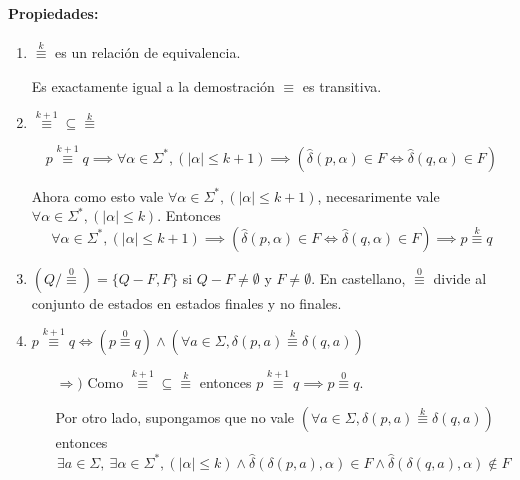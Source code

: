 \paragraph{Propiedades:}
\begin{enumerate}
  \item \(\overset{k}{\equiv}\) es un relación de equivalencia.
        \begin{demo}[\textwidth]
          Es exactamente igual a la demostración \(\equiv\) es transitiva.
        \end{demo}
  \item \(\overset{k+1}{\equiv}\subseteq\overset{k}{\equiv}\)
        \begin{demo}[\textwidth]
          \[ p \overset{k+1}{\equiv} q \implies \forall \alpha\in\Sigma^*, (|\alpha|\leq k+1) \implies (\hat\delta(p,\alpha) \in F \iff \hat\delta(q,\alpha) \in F)\]

          Ahora como esto vale \(\forall \alpha\in\Sigma^*, (|\alpha|\leq k+1)\), necesarimente vale \(\forall \alpha\in\Sigma^*, (|\alpha|\leq k)\). Entonces
          \[ \forall \alpha\in\Sigma^*, (|\alpha|\leq k+1) \implies (\hat\delta(p,\alpha) \in F \iff \hat\delta(q,\alpha) \in F) \implies p \overset{k}{\equiv} q\]
        \end{demo}
  \item \(\left(Q / \overset{0}{\equiv}\right) = \{Q-F, F\}\) si \(Q - F \neq \emptyset\) y \(F \neq\emptyset\). En castellano, \(\overset{0}{\equiv}\) divide al conjunto de estados en estados finales y no finales.
  \item \(
        p\overset{k+1}{\equiv} q \iff \left(p \overset{0}{\equiv} q
        \right) \land \left(
        \forall a\in\Sigma, \delta(p,a) \overset{k}{\equiv} \delta(q,a)
        \right)
        \)
        \begin{demo}[\textwidth]
          \begin{itemize}
            \item[\(\Rightarrow)\)] Como \(\overset{k+1}{\equiv} \subseteq \overset{k}{\equiv}\) entonces \( p\overset{k+1}{\equiv} q \implies p \overset{0}{\equiv} q\).

              Por otro lado, supongamos que no vale \(\left(
              \forall a\in\Sigma, \delta(p,a) \overset{k}{\equiv} \delta(q,a)
              \right)\) entonces
              \[
                \exists a\in\Sigma,~\exists\alpha\in\Sigma^*, (|\alpha|\leq k) \land \hat\delta(\delta(p,a), \alpha) \in F \land \hat\delta(\delta(q,a),\alpha) \notin F
              \]


\end{itemize}
\end{demo}
\end{enumerate}
